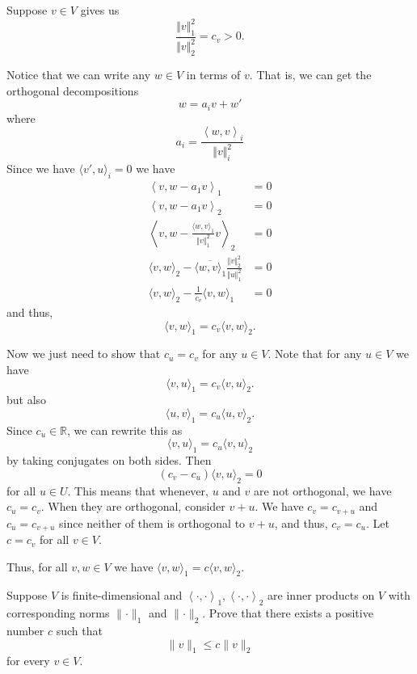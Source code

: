 \documentclass[12pt, letterpaper]{hmcpset}
\begin{document}
\begin{solution}
	Suppose $v \in V$ gives us
	\[
		\frac{\Vert v \Vert_1^2}{\Vert v \Vert_2^2} = c_v > 0.
	\]

	Notice that we can write any $w \in V$ in terms of $v$. That is, we can get the orthogonal decompositions
	\[
		w = a_i v + w'
	\]
	where
	\[
		a_i = \frac{\left < w, v \right >_i}{\Vert v \Vert_i^2}
	\]
	Since we have $\langle v', u \rangle_i = 0$ we have
	\[
		\begin{split}
			\left < v, w - a_1 v \right >_1 & = 0 \\
			\left < v, w - a_1 v \right >_2 & = 0 \\
			\left < v, w - \frac{\langle w, v \rangle_1}{\Vert v \Vert_1^2} v \right >_2 & = 0 \\
			\langle v, w \rangle_2 - \overline{\langle w, v \rangle_1} \frac{\Vert v \Vert_2^2}{\Vert u \Vert_1^2} & = 0 \\
			\langle v, w \rangle_2 - \frac{1}{c_v} \langle v, w \rangle_1 & = 0
		\end{split}
	\]
	and thus,
	\[
		\langle v, w \rangle_1 = c_v \langle v, w \rangle_2.
	\]

	Now we just need to show that $c_u = c_v$ for any $u \in V$. Note that for any $u \in V$ we have
	\[
		\langle v, u \rangle_1 = c_v \langle v, u \rangle_2.
	\]
	but also
	\[
		\langle u, v \rangle_1 = c_u \langle u, v \rangle_2.
	\]
	Since $c_u \in \mathbb{R}$, we can rewrite this as 
	\[
		\langle v, u \rangle_1 = c_u \langle v, u \rangle_2
	\]
	by taking conjugates on both sides. Then
	\[
		(c_v - c_u) \langle v, u \rangle_2 = 0
	\]
	for all $u \in U$. This means that whenever, $u$ and $v$ are not orthogonal, we have $c_u = c_v$. When they are orthogonal, consider $v + u$. We have $c_v = c_{v + u}$ and $c_u = c_{v + u}$ since neither of them is orthogonal to $v + u$, and thus, $c_v = c_u$. Let $c = c_v$ for all $v \in V$.

	Thus, for all $v, w \in V$ we have $\langle v, w \rangle_1 = c \langle v, w \rangle_2$.
\end{solution}

\pagebreak

\begin{problem}[12.]
	Suppose $V$ is finite-dimensional and $\left < \cdot, \cdot \right >_1, \left < \cdot, \cdot \right >_2$ are inner products on $V$ with corresponding norms $\lVert \cdot \rVert_1$ and $\lVert \cdot \rVert_2$. Prove that there exists a positive number $c$ such that
	\[
		\lVert v \rVert_1 \le c \lVert v \rVert_2
	\]
	for every $v \in V$.
\end{problem}
\end{document}
